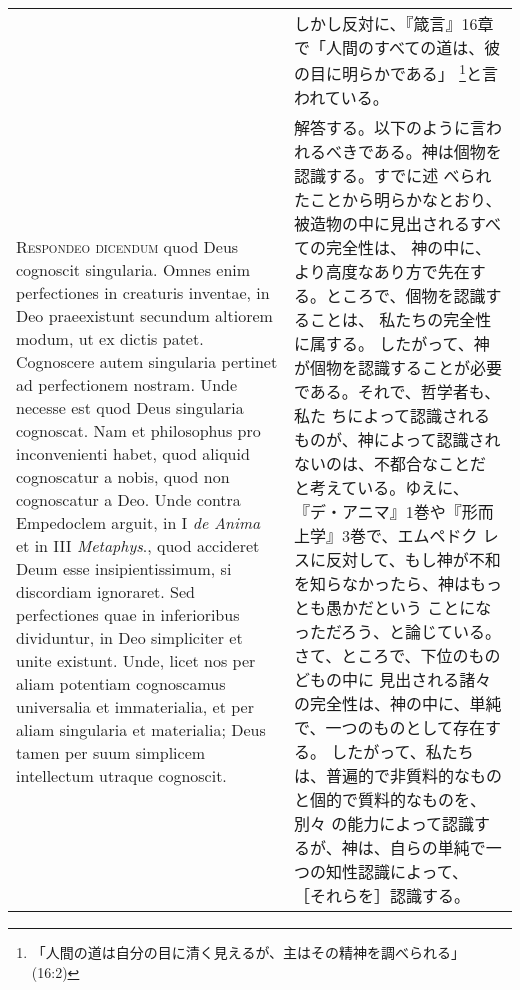 \documentclass[10pt]{jsarticle} %
\begin{document}
\begin{longtable}{p{21em}p{21em}}
&

しかし反対に、『箴言』16章で「人間のすべての道は、彼の目に明らかである」
\footnote{「人間の道は自分の目に清く見えるが、主はその精神を調べられる」
(16:2)}と言われている。

\\


{\scshape Respondeo dicendum} quod Deus cognoscit singularia. Omnes
enim perfectiones in creaturis inventae, in Deo praeexistunt secundum
altiorem modum, ut ex dictis patet. Cognoscere autem singularia
pertinet ad perfectionem nostram. Unde necesse est quod Deus
singularia cognoscat. Nam et philosophus pro inconvenienti habet, quod
aliquid cognoscatur a nobis, quod non cognoscatur a Deo. Unde contra
Empedoclem arguit, in I {\itshape de Anima} et in III {\itshape
Metaphys}., quod accideret Deum esse insipientissimum, si discordiam
ignoraret. Sed perfectiones quae in inferioribus dividuntur, in Deo
simpliciter et unite existunt. Unde, licet nos per aliam potentiam
cognoscamus universalia et immaterialia, et per aliam singularia et
materialia; Deus tamen per suum simplicem intellectum utraque
cognoscit.


&

解答する。以下のように言われるべきである。神は個物を認識する。すでに述
べられたことから明らかなとおり、被造物の中に見出されるすべての完全性は、
神の中に、より高度なあり方で先在する。ところで、個物を認識することは、
私たちの完全性に属する。
したがって、神が個物を認識することが必要である。それで、哲学者も、私た
ちによって認識されるものが、神によって認識されないのは、不都合なことだ
と考えている。ゆえに、『デ・アニマ』1巻や『形而上学』3巻で、エムペドク
レスに反対して、もし神が不和を知らなかったら、神はもっとも愚かだという
ことになっただろう、と論じている。さて、ところで、下位のものどもの中に
見出される諸々の完全性は、神の中に、単純で、一つのものとして存在する。
したがって、私たちは、普遍的で非質料的なものと個的で質料的なものを、別々
の能力によって認識するが、神は、自らの単純で一つの知性認識によって、
［それらを］認識する。


\end{longtable}
\end{document}
